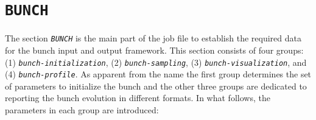 \section{\texttt{BUNCH}}

The section {\tt \small \em BUNCH} is the main part of the job file to establish the required data for the bunch input and output framework.
%
This section consists of four groups: (1) {\tt \em \small bunch-initialization}, (2) {\tt \em \small bunch-sampling}, (3) {\tt \em \small bunch-visualization}, and (4) {\tt \em \small bunch-profile}.
%
As apparent from the name the first group determines the set of parameters to initialize the bunch and the other three groups are dedicated to reporting the bunch evolution in different formats.
%
In what follows, the parameters in each group are introduced:

